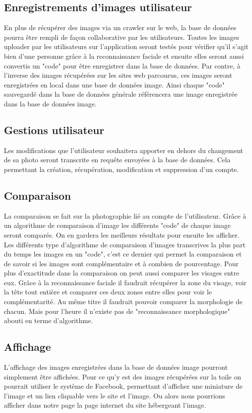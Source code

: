 \documentclass[a4paper,12pt]{article}
\begin{document}
 \subsection{Enregistrements d'images utilisateur}
 En plus de récupérer des images via un crawler sur le web, la base de données pourra être rempli de façon collaborative par les utilisateurs. Toutes les images uploader par les utilisateurs sur l'application seront testés pour vérifier qu'il s'agit bien d'une personne grâce à la reconnaissance faciale et ensuite elles seront aussi convertis un "code" pour être enregistrer dans la base de données. Par contre, à l'inverse des images récupérées sur les sites web parcourus, ces images seront enregistrées en local dans une base de données image. Ainsi chaque "code" sauvegardé dans la base de données générale référencera une image enregistrée dans la base de données image. 
 \subsection{Gestions utilisateur}
 Les modifications que l'utilisateur souhaitera apporter en dehors du changement de sa photo seront transcrite en requête envoyées à la base de données.  Cela permettant la création, récupération, modification et suppression d'un compte. 
 \subsection{Comparaison}
 La comparaison se fait sur la photographie lié au compte de l'utilisateur. Grâce à un algorithme de comparaison d'image les différents "code" de chaque image seront comparés. On en gardera les meilleurs résultats pour ensuite les afficher. Les différents type d'algorithme de comparaison d'images transcrives la plus part du temps les images en un "code", c'est ce dernier qui permet la comparaison et de savoir si les images sont complémentaire et à combien de pourcentage. Pour plus d'exactitude dans la comparaison on peut aussi comparer les visages entre eux. Grâce à la reconnaissance faciale il faudrait récupérer la zone du visage, voir la tête tout entière et comparer ces deux zones entre elles pour voir le complémentarité. Au même titre il faudrait pouvoir comparer la morphologie de chacun. Mais pour l'heure il n'existe pas de "reconnaissance morphologique" abouti en terme d'algorithme. 

\subsection{Affichage}
L'affichage des images enregistrées dans la base de données image pourront simplement être affichées. Pour ce qu'y est des images récupérées sur la toile on pourrait utiliser le système de Facebook, permettant d'afficher une miniature de l'image et un lien cliquable vers le site et l'image. Ou alors nous pourrions afficher dans notre page la page internet du site hébergeant l'image. 
\end{document}
